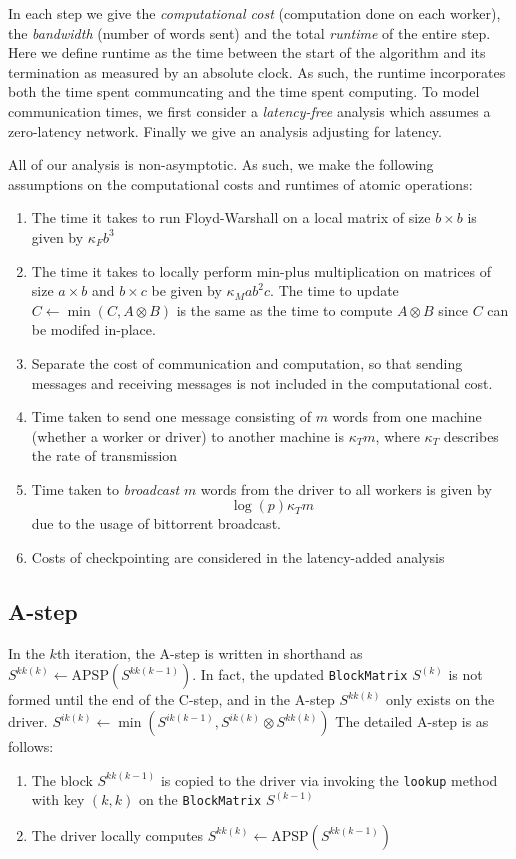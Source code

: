 \documentclass{article} %
\begin{document}
In each step we give the \emph{computational cost} (computation done
on each worker), the \emph{bandwidth} (number of words sent) and the
total \emph{runtime} of the entire step.  Here we define runtime as
the time between the start of the algorithm and its termination as
measured by an absolute clock. As such, the runtime incorporates both
the time spent communcating and the time spent computing.  To model
communication times, we first consider a \emph{latency-free} analysis
which assumes a zero-latency network.  Finally we give an analysis
adjusting for latency.

All of our analysis is non-asymptotic.  As such, we make the following
assumptions on the computational costs and runtimes of atomic
operations:

\begin{enumerate}
\item The time it takes to run Floyd-Warshall on a local matrix of size $b \times b$ is given by $\kappa_F b^3$
\item The time it takes to locally perform min-plus multiplication on
  matrices of size $a \times b$ and $b \times c$ be given by $\kappa_M
  ab^2c$. The time to update $C \leftarrow \min(C, A \otimes B)$ is the
  same as the time to compute $A \otimes B$ since $C$ can be modifed in-place.
\item Separate the cost of communication and computation, so that
  sending messages and receiving messages is not included in the
  computational cost.
\item Time taken to send one message consisting of $m$ words from one
  machine (whether a worker or driver) to another machine is $\kappa_T m$,
where $\kappa_T$ describes the rate of transmission
\item Time taken to \emph{broadcast} $m$ words from the driver to all workers is given by
\[
\log(p) \kappa_T m
\]
due to the usage of bittorrent broadcast.
\item Costs of checkpointing are considered in the latency-added analysis
\end{enumerate}


\subsection{A-step}

In the $k$th iteration, the A-step is written in shorthand as
$S^{kk(k)} \leftarrow \text{APSP}(S^{kk(k-1)})$.  In fact, the updated
{\tt BlockMatrix} $S^{(k)}$ is not formed until the end of the C-step,
and in the A-step $S^{kk(k)}$ only exists on the driver.
$S^{ik(k)} \leftarrow \min(S^{ik(k-1)}, S^{ik(k)} \otimes S^{kk(k)})$
The detailed A-step is as follows:
\begin{enumerate}
\item The block $S^{kk(k-1)}$ is copied to the driver via invoking the {\tt lookup} method with key $(k, k)$ on the {\tt  BlockMatrix} $S^{(k-1)}$
\item The driver locally computes $S^{kk(k)} \leftarrow \text{APSP}(S^{kk(k-1)})$
\end{enumerate}
\end{document}
